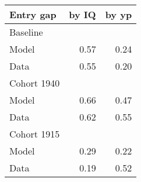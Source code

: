 \begin{tabular}{lrr}
\hline
Entry gap & by IQ  & by yp  \\
\hline
Baseline &   &   \\
Model & 0.57  & 0.24  \\
Data & 0.55  & 0.20  \\
Cohort 1940 &   &   \\
Model & 0.66  & 0.47  \\
Data & 0.62  & 0.55  \\
Cohort 1915 &   &   \\
Model & 0.29  & 0.22  \\
Data & 0.19  & 0.52  \\
\hline
\end{tabular}%
